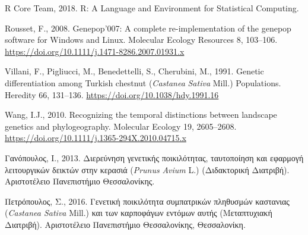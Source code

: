 \documentclass[12pt,a4paper,]{report}
\begin{document}
\leavevmode\hypertarget{ref-RCoreTeam2018}{}%
R Core Team, 2018. R: A Language and Environment for Statistical
Computing.

\leavevmode\hypertarget{ref-Rousset2008}{}%
Rousset, F., 2008. Genepop'007: A complete re-implementation of the
genepop software for Windows and Linux. Molecular Ecology Resources 8,
103--106. \url{https://doi.org/10.1111/j.1471-8286.2007.01931.x}

\leavevmode\hypertarget{ref-Villani1991}{}%
Villani, F., Pigliucci, M., Benedettelli, S., Cherubini, M., 1991.
Genetic differentiation among Turkish chestnut (\emph{Castanea}
\emph{Sativa} Mill.) Populations. Heredity 66, 131--136.
\url{https://doi.org/10.1038/hdy.1991.16}

\leavevmode\hypertarget{ref-Wang2010a}{}%
Wang, I.J., 2010. Recognizing the temporal distinctions between
landscape genetics and phylogeography. Molecular Ecology 19, 2605--2608.
\url{https://doi.org/10.1111/j.1365-294X.2010.04715.x}

\leavevmode\hypertarget{ref-__2013}{}%
Γανόπουλος, Ι., 2013. Διερεύνηση γενετικής ποικιλότητας, ταυτοποίηση και
εφαρμογή λειτουργικών δεικτών στην κερασιά (\emph{Prunus} \emph{Avium}
L.) (Διδακτορική Διατριβή). Αριστοτέλειο Πανεπιστήμιο Θεσσαλονίκης.

\leavevmode\hypertarget{ref-2016a}{}%
Πετρόπουλος, Σ., 2016. Γενετική ποικιλότητα συμπατρικών πληθυσμών
καστανιας (\emph{Castanea Sativa} Mill.) και των καρποφάγων εντόμων
αυτής (Mεταπτυχιακή Διατριβή). Αριστοτέλειο Πανεπιστήμιο Θεσσαλονίκης,
Θεσσαλονίκη.
\end{document}
